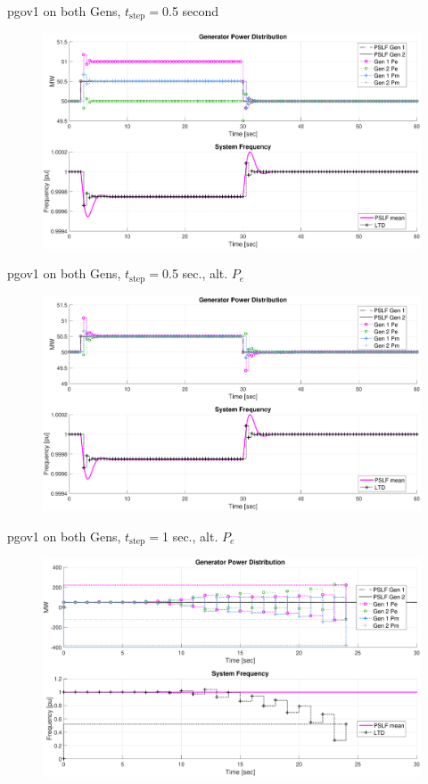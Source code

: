 \documentclass[14pt, unknownkeysallowed]{beamer}
\begin{document}
\begin{frame}
pgov1 on both Gens, $t_\text{step}=$0.5 second
\begin{figure}
	\includegraphics[width=\linewidth]{pgov1Bh}
\end{figure}
\end{frame}
\begin{frame}
pgov1 on both Gens, $t_\text{step}=$0.5 sec., alt. $P_e$
\begin{figure}
	\includegraphics[width=\linewidth]{pgov1B1a}
\end{figure}
\end{frame}
\begin{frame}
pgov1 on both Gens, $t_\text{step}=$1 sec., alt. $P_e$
\begin{figure}
	\includegraphics[width=\linewidth]{pgov1B1full}
\end{figure}
\end{frame}
\end{document}
